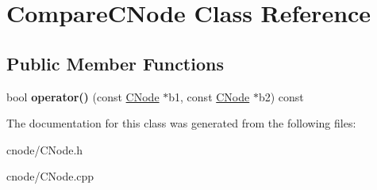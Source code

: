 \hypertarget{classCompareCNode}{\section{\-Compare\-C\-Node \-Class \-Reference}
\label{classCompareCNode}
}
\subsection*{\-Public \-Member \-Functions}
\begin{DoxyCompactItemize}
\item 
\hypertarget{classCompareCNode_a4c470063772797204a23e43755a9a9c0}{bool {\bfseries operator()} (const \hyperlink{classCNode}{\-C\-Node} $\ast$b1, const \hyperlink{classCNode}{\-C\-Node} $\ast$b2) const }\label{classCompareCNode_a4c470063772797204a23e43755a9a9c0}

\end{DoxyCompactItemize}


\-The documentation for this class was generated from the following files\-:\begin{DoxyCompactItemize}
\item 
cnode/\-C\-Node.\-h\item 
cnode/\-C\-Node.\-cpp\end{DoxyCompactItemize}
